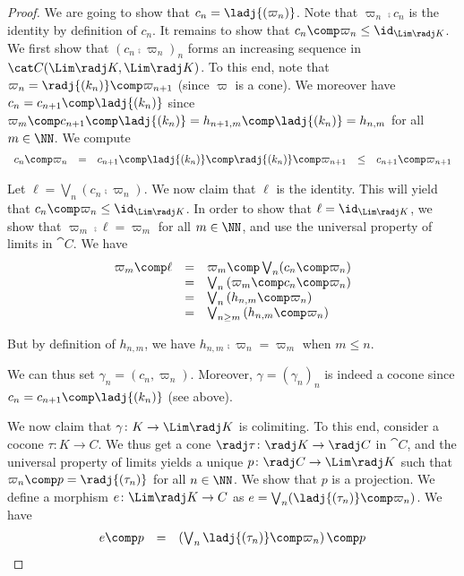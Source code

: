 \begin{proof}
We are going to show that $c_n = \ladj{(\varpi_n)}$.
Note that $\varpi_n \comp c_n$ is the identity by definition of $c_n$.
It remains to show that $c_n \comp \varpi_n \leq \id_{\Lim \radj K}$.
We first show that
$(c_n \comp \varpi_n)_n$ forms an increasing sequence
in $\cat C(\Lim \radj K, \Lim \radj K)$.
To this end, note that $\varpi_n = \radj{(k_n)} \comp \varpi_{n+1}$ 
(since $\varpi$ is a cone).
We moreover have
$c_n = c_{n+1} \comp \ladj{(k_n)}$
since
\(
  \varpi_m \comp c_{n+1} \comp \ladj{(k_n)}
  =
  h_{n+1,m} \comp \ladj{(k_n)}
  =
  h_{n,m}
\)
for all $m \in \NN$.
We compute
\[
\begin{array}{*{5}{l}}
  c_n \comp \varpi_n
& =
& c_{n+1} \comp \ladj{(k_n)} \comp \radj{(k_n)} \comp \varpi_{n+1}
& \leq
& c_{n+1} \comp \varpi_{n+1}
\end{array}
\]

Let $\ell = \bigvee_{n}(c_n \comp \varpi_n)$.
We now claim that $\ell$ is the identity.
This will yield that $c_n \comp \varpi_n \leq \id_{\Lim \radj K}$.
In order to show that $\ell = \id_{\Lim \radj K}$,
we show that $\varpi_m \comp \ell = \varpi_m$ for all $m \in \NN$,
and use the universal property of limits in $\cat C$.
We have
\[
\begin{array}{l l l}
  \varpi_m \comp \ell
& =
& \varpi_m \comp \bigvee_{n}(c_n \comp \varpi_n)
\\

& =
& \bigvee_n \left(
  \varpi_m \comp c_n \comp \varpi_n
  \right)
\\

& =
& \bigvee_n \left(
  h_{n,m} \comp \varpi_n
  \right)
\\

& =
& \bigvee_{n\geq m} \left(
  h_{n,m} \comp \varpi_n
  \right)
\end{array}
\]

\noindent
But by definition of $h_{n,m}$, we have
$h_{n,m} \comp \varpi_n = \varpi_m$ when $m \leq n$.

We can thus set $\gamma_n = (c_n, \varpi_n)$.
Moreover, $\gamma = (\gamma_n)_n$ is indeed a cocone since
$c_n = c_{n+1} \comp \ladj{(k_n)}$ (see above).

We now claim that $\gamma \colon K \to \Lim \radj K$ is colimiting.
To this end, consider a cocone $\tau \colon K \to C$.
We thus get a cone $\radj\tau \colon \radj K \to \radj C$ in $\cat C$,
and the universal property of limits yields a unique
$p \colon \radj C \to \Lim \radj K$ such that
$\varpi_n \comp p = \radj{(\tau_n)}$ for all $n \in \NN$.
We show that $p$ is a projection.
We define a morphism $e \colon \Lim \radj K \to C$
as $e = \bigvee_{n}(\ladj{(\tau_n)} \comp \varpi_n)$.
We have
\[
\begin{array}{l l l}
  e \comp p
& =
& \left( \bigvee_{n} \ladj{(\tau_n)} \comp \varpi_n \right) \comp p
\\


\end{array}\]
\end{proof}
